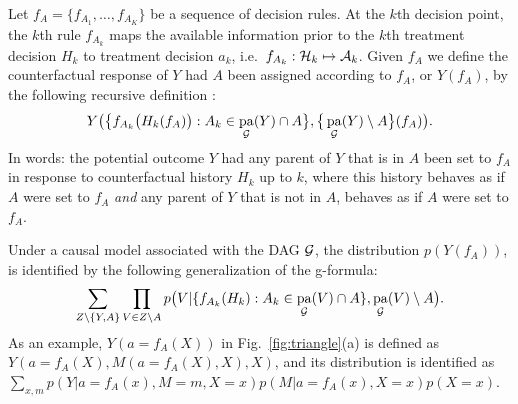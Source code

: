 \documentclass{article}
\DeclareMathOperator{\pa}{pa}
\begin{document}
Let $f_A = \{f_{A_1}, \ldots, f_{A_K} \}$ be a sequence of decision rules. 
At the $k$th decision point, the $k$th rule $f_{A_k}$ maps the available information prior to the $k$th treatment decision $H_k$ to treatment decision $a_k$, i.e.\ $f_{A_k}: {{\cal H}_k} \mapsto {{\cal A}_k}$.
Given $f_A$ we define the counterfactual response of $Y$ had $A$ been assigned according to $f_A$,
or $Y(f_A)$, by the following recursive definition \citep[cf.][]{robins04SNMM,thomas13swig}:
{\small
\begin{align*}
Y\big(
\big\{ f_{A_k}\big(H_k(f_{A})\big): A_k \in \pa_{\cal G}(Y)\cap A \big\},
\big\{ \pa_{\cal G}(Y) \setminus A \big\}(f_A)
\big).
\end{align*} 
}%
In words: the potential outcome $Y$ had any parent of $Y$ that is in $A$ been set to $f_A$ in response to counterfactual history $H_k$ up to $k$, where this history behaves as if $A$ were set to $f_A$ \textit{and} any parent of $Y$ that is not in $A$, behaves as if $A$ were set to $f_A$. 

Under a causal model associated with the DAG $\cal G$, the distribution $p(Y(f_A))$, is identified by the following generalization of the g-formula:
{\scriptsize
\begin{align*}
\sum_{Z \setminus \{Y, A \}}   \prod_{V \in Z \setminus A}
p\big(V | \{ f_{A_k}(H_k): A_k \in \pa_{\cal G}(V) \cap A \}, \pa_{\cal G}(V) \setminus A \big).
\end{align*}
}%
As an example, $Y(a = f_A(X))$ in Fig.~\ref{fig:triangle}(a) is defined as $Y(a=f_A(X), M(a=f_A(X),X), X)$, 
and its distribution is identified as
$\sum_{x,m} p(Y | a=f_A(x),M=m,X=x) p(M | a=f_A(x),X=x) p(X=x)$.
\end{document}
